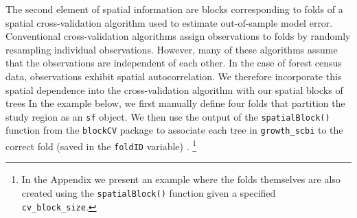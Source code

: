 \documentclass[12pt]{article}
\begin{document}
The second element of spatial information are blocks corresponding to
folds of a spatial cross-validation algorithm used to estimate
out-of-sample model error. Conventional cross-validation algorithms
assign observations to folds by randomly resampling individual
observations. However, many of these algorithms assume that the
observations are independent of each other. In the case of forest census
data, observations exhibit spatial autocorrelation. We therefore
incorporate this spatial dependence into the cross-validation algorithm
with our spatial blocks of trees \citep[
\citet{pohjankukka_estimating_2017}]{roberts_cross-validation_2017} In
the example below, we first manually define four folds that partition
the study region as an \texttt{sf} object. We then use the output of the
\texttt{spatialBlock()} function from the \texttt{blockCV} package to
associate each tree in \texttt{growth\_scbi} to the correct fold (saved
in the \texttt{foldID} variable) \citep{valavi_blockcv_2019}. \footnote{In
  the Appendix we present an example where the folds themselves are also
  created using the \texttt{spatialBlock()} function given a specified
  \texttt{cv\_block\_size}.}
\end{document}
